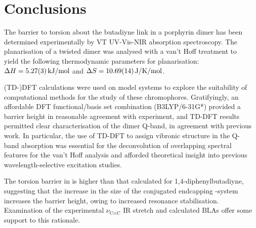 \section{Conclusions}

	The barrier to torsion about the butadiyne link in a porphyrin dimer has been determined experimentally by VT UV-Vis-NIR absorption spectroscopy. The planarisation of a twisted dimer was analysed with a van't Hoff treatment to yield the following thermodynamic parameters for planarisation: $\delh = \SI{5.27 \pm 0.03}{\kjmol}$ and $\dels = \SI{10.69 \pm 0.14}{\jkmol}$. 

	(TD-)DFT calculations were used on model systems to explore the suitability of computational methods for the study of these chromophores. Gratifyingly, an affordable DFT functional/basis set combination (B3LYP/6-31G*) provided a barrier height in reasonable agreement with experiment, and TD-DFT results permitted clear characterisation of the dimer Q-band, in agreement with previous work.\autocite{Winters2007} In particular, the use of TD-DFT to assign vibronic structure in the Q-band absorption was essential for the deconvolution of overlapping spectral features for the van't Hoff analysis and afforded theoretical insight into previous wavelength-selective excitation studies.

	The torsion barrier in  is higher than that calculated for 1,4-diphenylbutadiyne, suggesting that the increase in the size of the conjugated endcapping \pii-system increases the barrier height, owing to increased resonance stabilisation. Examination of the experimental $\nu_{\text{C}\equiv{}\text{C}}$ IR stretch and calculated BLAs offer some support to this rationale.




